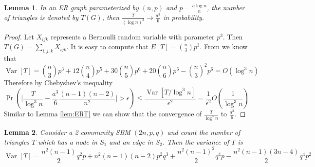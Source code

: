 \documentclass{article}
\newtheorem{lemma}{Lemma}
\DeclareMathOperator{\Var}{Var}
\begin{document}
\begin{lemma}\label{lem:ER_tr_counting}
	In an ER graph parameterized by $(n,p)$ and $p=\frac{a\log n}{n}$, the number of triangles is denoted by $T(G)$, then
	$\frac{T}{(\log n)^3} \to \frac{a^3}{6}$ in probability.
\end{lemma}
\begin{proof}
	Let $X_{ijk}$ represents a Bernoulli random variable with parameter $p^3$.
	Then $T(G) = \sum_{i,j,k} X_{ijk}$.
	It is easy to compute that $E[T] = \binom{n}{3}p^3$.
	From \cite{holland1977method} we know that
	$$
	\Var[T] = \binom{n}{3} p^3 + 12 \binom{n}{4} p^5 + 30 \binom{n}{5} p^6 + 20 \binom{n}{6} p^6 - \binom{n}{3}^2 p^6 = O(\log^3 n)
	$$
	Therefore
	by Chebyshev's inequality
	$$
	\Pr(\Big|\frac{T}{\log^3 n } - \frac{a^3}{6} \frac{(n-1)(n-2)}{n^2}\Big| > \epsilon) \leq \frac{\Var[T /\log^3 n ]}{\epsilon^2} 
	= \frac{1}{\epsilon^2}O(\frac{1}{\log^3 n})
	$$
	Similar to Lemma \ref{lem:ERT} we can show that the convergence of $\frac{T}{\log^3 n}$ to $\frac{a^3}{6}$.
\end{proof}
\begin{lemma}\label{lem:SBM_tr_counting_cross}
	Consider a 2 community SBM $(2n, p, q)$ and count the number of triangles $T$ which has a node in $S_1$ and an edge in $S_2$.
	Then the variance of $T$ is
	\begin{equation}\label{eq:SBM_tr_counting_cross}
	\Var[T] = \frac{n^2(n-1)}{2}q^2p + n^2(n-1)(n-2)p^2q^3 +\frac{n^2(n-1)^2}{2}q^4p - \frac{n^2(n-1)(3n-4)}{2}q^4 p^2
	\end{equation}
\end{lemma}
\end{document}
